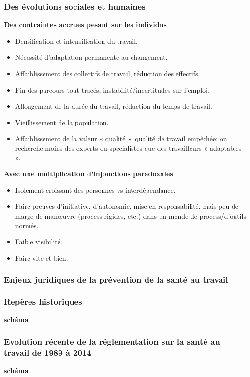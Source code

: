 \documentclass{beamer}
\begin{document}
\begin{frame}
\frametitle{Des évolutions sociales et humaines}
\textbf{Des contraintes accrues pesant sur les individus}
\begin{itemize}
\item Densification et intensification du travail.
\item Nécessité d’adaptation permanente au changement.
\item Affaiblissement des collectifs de travail, réduction des effectifs.
\item Fin des parcours tout tracés, instabilité/incertitudes sur l’emploi.
\item Allongement de la durée du travail, réduction du temps de travail.
\item Vieillissement de la population.
\item Affaiblissement de la valeur « qualité », qualité de travail empêchée: on recherche moins des experts 
ou spécialistes que des travailleurs « adaptables ».
\end{itemize}
\textbf{Avec une multiplication d’injonctions paradoxales}
\begin{itemize}
\item Isolement croissant des personnes vs interdépendance.
\item Faire preuves d’initiative, d’autonomie, mise en responsabilité, mais peu de marge de manœuvre (process 
rigides, etc.) dans un monde de process/d’outils normés.
\item Faible visibilité.
\item Faire vite et bien.
\end{itemize}
\end{frame}

\begin{frame}
\frametitle{Enjeux juridiques de la prévention de la santé au travail}
\end{frame} 

\begin{frame}
\frametitle{Repères historiques}
\textbf{schéma}
\end{frame} 

\begin{frame}
\frametitle{Evolution récente de la réglementation sur la santé au travail de 1989 à 2014}
\textbf{schéma}
\end{frame}
\end{document}
